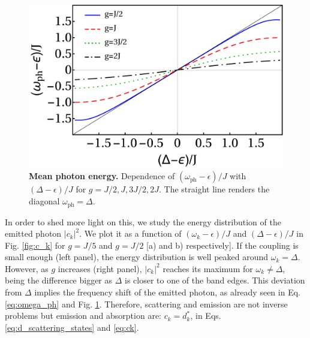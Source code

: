 \documentclass[aps,pra,twocolumn,floatfix,superscriptaddress]{revtex4-1}%
\begin{document}
\begin{figure}[thb!]
\includegraphics[width=1.0\columnwidth]{E_ph_vs_delta.pdf}
\caption{{\bf Mean photon energy.} Dependence of $(\omega_\text{ph}-\epsilon)/J$ with $(\Delta-\epsilon)/J$ for $g=J/2,J,3J/2,2J$. The straight line renders the diagonal $\omega_\text{ph}=\Delta$.%
}\label{fig:E_ph}
\end{figure}

In order to shed more light on this, we study the energy distribution of the emitted photon $|c_k|^2$. We plot it as a function of $(\omega_k-\epsilon)/J$ and $(\Delta-\epsilon)/J$ in Fig. \ref{fig:c_k} for $g=J/5$ and $g=J/2$ [a) and b) respectively]. If the coupling is small enough (left panel), the energy distribution is well peaked around $\omega_k=\Delta$. However, as $g$ increases (right panel), $|c_k|^2$ reaches its maximum for $\omega_k\neq\Delta$, being the difference bigger as $\Delta$ is closer to one of the band edges. This deviation from $\Delta$ implies the frequency shift of the emitted photon, as already seen in Eq. \eqref{eq:omega_ph} and Fig. \ref{fig:E_ph}.
Therefore,   scattering and emission are not inverse problems but
emission and absorption  are:    $c_k=d_k^*$, in Eqs.  \eqref{eq:d_scattering_states} and \eqref{eq:ck}.
\end{document}
